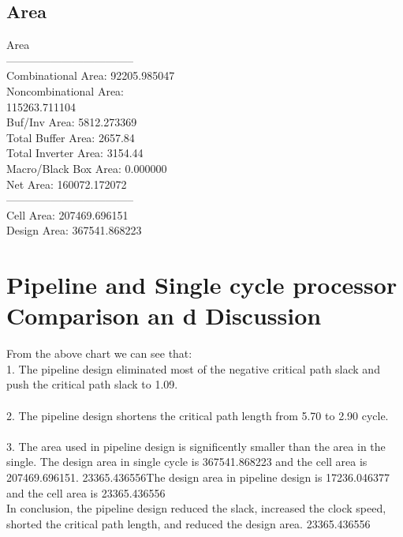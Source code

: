 \documentclass[12pt]{article}
\begin{document}
  \subsection{Area}
  Area\\
  -----------------------------------\\
  Combinational Area:    92205.985047\\
  Noncombinational Area:\\
                        115263.711104\\
  Buf/Inv Area:           5812.273369\\
  Total Buffer Area:          2657.84\\
  Total Inverter Area:        3154.44\\
  Macro/Black Box Area:      0.000000\\
  Net Area:             160072.172072\\
  -----------------------------------\\
  Cell Area:            207469.696151\\
  Design Area:          367541.868223\\
\section{Pipeline and Single cycle processor Comparison an d Discussion }
From the above chart we can see that: \\
1. The pipeline design eliminated most of the negative critical path slack and push the critical path slack to 1.09. \\\\
2. The pipeline design shortens the critical path length from 5.70 to 2.90 cycle.\\\\
3. The area used in pipeline design is significently smaller than the area in the single. The design area in single cycle is 367541.868223 and the cell area is 207469.696151.  23365.436556The design area in pipeline design is 17236.046377 and the cell area is  23365.436556\\

In conclusion, the pipeline design reduced the slack, increased the clock speed, shorted the critical path length, and reduced the design area. 23365.436556
\end{document}
